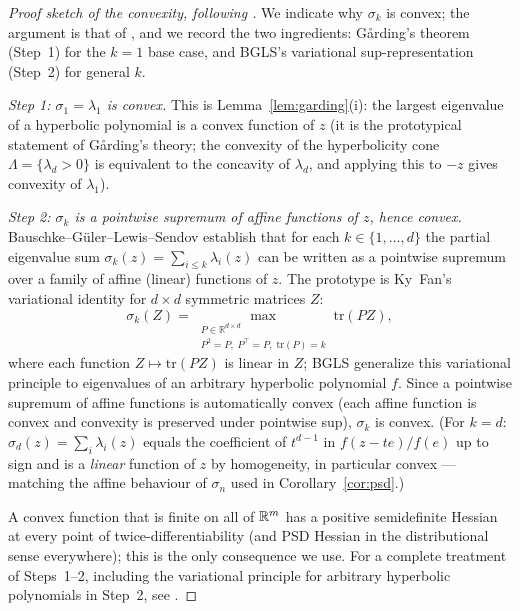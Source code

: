 \begin{proof}[Proof sketch of the convexity, following \cite{BGLS}]
We indicate why $\sigma_k$ is convex; the argument is that of \cite{BGLS}, and we
record the two ingredients: G\aa rding's theorem (Step~1) for the $k=1$ base case,
and BGLS's variational sup-representation (Step~2) for general $k$.

\smallskip\noindent\emph{Step 1: $\sigma_1=\lambda_1$ is convex.} This is
Lemma~\ref{lem:garding}(i): the largest eigenvalue of a hyperbolic polynomial is
a convex function of $z$ (it is the prototypical statement of G\aa rding's
theory; the convexity of the hyperbolicity cone $\Lambda=\{\lambda_d>0\}$ is
equivalent to the concavity of $\lambda_d$, and applying this to $-z$ gives
convexity of $\lambda_1$).

\smallskip\noindent\emph{Step 2: $\sigma_k$ is a pointwise supremum of affine
functions of $z$, hence convex.}
Bauschke--G\"uler--Lewis--Sendov establish \cite[\S4--5]{BGLS} that for each
$k\in\{1,\dots,d\}$ the partial eigenvalue sum $\sigma_k(z)=\sum_{i\le k}\lambda_i(z)$
can be written as a pointwise supremum over a family of affine (linear) functions of
$z$. The prototype is Ky~Fan's variational identity for $d\times d$ symmetric matrices
$Z$:
\[
\sigma_k(Z)=\max_{\substack{P\in\mathbb R^{d\times d}\\P^2=P,\;P^\top=P,\;\mathrm{tr}(P)=k}}
\mathrm{tr}(PZ),
\]
where each function $Z\mapsto\mathrm{tr}(PZ)$ is linear in $Z$; BGLS generalize this
variational principle to eigenvalues of an arbitrary hyperbolic polynomial $f$.
Since a pointwise supremum of affine functions is automatically convex (each affine
function is convex and convexity is preserved under pointwise sup), $\sigma_k$ is
convex.  (For $k=d$: $\sigma_d(z)=\sum_i\lambda_i(z)$ equals the coefficient of
$t^{d-1}$ in $f(z-te)/f(e)$ up to sign and is a \emph{linear} function of $z$ by
homogeneity, in particular convex — matching the affine behaviour of $\sigma_n$ used
in Corollary~\ref{cor:psd}.)

\smallskip
A convex function that is finite on all of $\mathbb{R}^m$ has a positive
semidefinite Hessian at every point of twice-differentiability (and PSD Hessian
in the distributional sense everywhere); this is the only consequence we use.
For a complete treatment of Steps~1--2, including the variational principle for
arbitrary hyperbolic polynomials in Step~2, see \cite[Thms.~1--2 and \S4--5]{BGLS}.
\end{proof}

